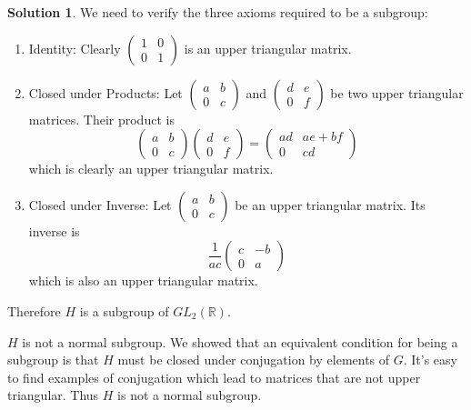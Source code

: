 \documentclass[12pt]{article}
\theoremstyle{definition}
\newcommand{\R}{\mathbb{R}}
\theoremstyle{definition}
\newtheorem{solution}{\color{Goldenrod}Solution}
\begin{document}
\begin{solution}
We need to verify the three axioms required to be a subgroup:
\begin{enumerate}
	\item Identity: Clearly $\begin{pmatrix} 1 & 0 \\ 0 & 1 \end{pmatrix}$ is an upper triangular matrix.
	\item Closed under Products: Let $\begin{pmatrix} a & b \\ 0 & c \end{pmatrix}$ and $\begin{pmatrix} d & e \\ 0 & f \end{pmatrix}$ be two upper triangular matrices. Their product is
	\begin{equation}
		\begin{pmatrix} a & b \\ 0 & c \end{pmatrix} \begin{pmatrix} d & e \\ 0 & f \end{pmatrix} =
		\begin{pmatrix}
		ad & ae + bf \\ 0 & cd
		\end{pmatrix}
	\end{equation}
	which is clearly an upper triangular matrix. 
	\item Closed under Inverse: Let $\begin{pmatrix} a & b \\ 0 & c \end{pmatrix}$ be an upper triangular matrix. Its inverse is
	\begin{equation}
		\frac{1}{ac} \begin{pmatrix} c & -b \\ 0 & a \end{pmatrix}
	\end{equation}
	which is also an upper triangular matrix.

\end{enumerate}
Therefore $H$ is a subgroup of $GL_2(\R)$.

$H$ is not a normal subgroup. We showed that an equivalent condition for being a subgroup is that $H$ must be closed under conjugation by elements of $G$. It's easy to find examples of conjugation which lead to matrices that are not upper triangular. Thus $H$ is not a normal subgroup. 
\end{solution}
\end{document}
